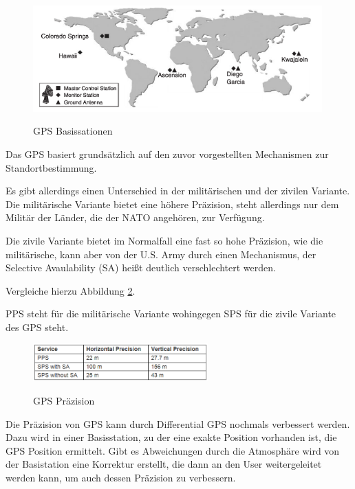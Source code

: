 \begin{figure}[h]
\centering
\includegraphics[width=0.99\textwidth]{ref/images/GPS_Basisstation.PNG}
\caption[GPS Basissationen]{GPS Basissationen}
\label{fig:GPS Basissationen}
\cite[S. 163]{Kuepper2005}
\end{figure}

Das GPS basiert grundsätzlich auf den zuvor vorgestellten Mechanismen zur Standortbestimmung. 

Es gibt allerdings einen Unterschied in der militärischen und der zivilen Variante. Die militärische Variante bietet eine höhere Präzision, steht allerdings nur dem Militär der Länder, die der NATO angehören, zur Verfügung. 

Die zivile Variante bietet im Normalfall eine fast so hohe Präzision, wie die militärische, kann aber von der U.S. Army durch einen Mechanismus, der Selective Avaulability (SA) heißt deutlich verschlechtert werden.

\cite[S. 194 - 196]{Schiller2004}

Vergleiche hierzu Abbildung \ref{fig:GPS Praezision}.

PPS steht für die militärische Variante wohingegen SPS für die zivile Variante des GPS steht.

\begin{figure}[h]
\centering
\includegraphics[width=0.6\textwidth]{ref/images/GPS_Praezision.PNG}
\caption[GPS Präzision]{GPS Präzision}
\label{fig:GPS Praezision}
\cite[S. 195]{Schiller2004}
\end{figure}

Die Präzision von GPS kann durch Differential GPS nochmals verbessert werden. Dazu wird in einer Basisstation, zu der eine exakte Position vorhanden ist, die GPS Position ermittelt. Gibt es Abweichungen durch die Atmosphäre wird von der Basistation eine Korrektur erstellt, die dann an den User weitergeleitet werden kann, um auch dessen Präzision zu verbessern.
\cite[S. 196]{Schiller2004}

